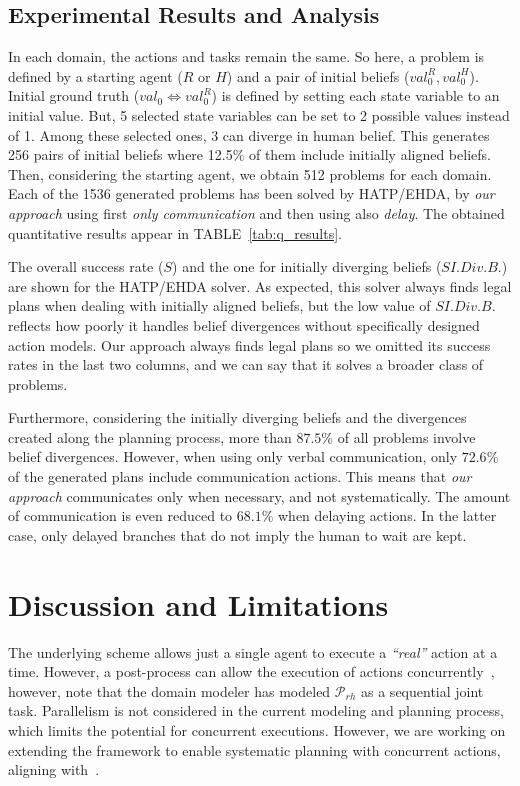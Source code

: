 \subsection{Experimental Results and Analysis}

In each domain, the actions and tasks remain the same. So here, a problem is defined by a starting agent ($R$ or $H$) and a pair of initial beliefs ($val^R_0, val^H_ 0$).
Initial ground truth ($val_0 \Leftrightarrow val^R_0$) is defined by setting each state variable to an initial value. But, 5 selected state variables can be set to 2 possible values instead of 1. Among these selected ones, 3 can diverge in human belief. This generates 256 pairs of initial beliefs where 12.5\% of them include initially aligned beliefs. Then, considering the starting agent, we obtain 512 problems for each domain. 
Each of the 1536 generated problems has been solved by HATP/EHDA, by \textit{our approach} using first \textit{only communication} and then using also \textit{delay}.
The obtained quantitative results appear in TABLE~\ref{tab:q_results}.
 
The overall success rate ($S$) and the one for initially diverging beliefs ($S I.Div.B.$) are shown for the HATP/EHDA solver. As expected, this solver always finds legal plans when dealing with initially aligned beliefs, but the low value of $S I.Div.B.$ reflects how poorly it handles belief divergences without specifically designed action models.
Our approach always finds legal plans so we omitted its success rates in the last two columns, and we can say that it solves a broader class of problems.

Furthermore, considering the initially diverging beliefs and the divergences created along the planning process, more than $87.5\%$ of all problems involve belief divergences. 
However, when using only verbal communication, only $72.6\%$ of the generated plans include communication actions.
This means that \textit{our approach} communicates only when necessary, and not systematically. 
The amount of communication is even reduced to $68.1\%$ when delaying actions. In the latter case, only delayed branches that do not imply the human to wait are kept. 

\section{Discussion and Limitations}

The underlying scheme allows just a single agent to execute a \textit{``real''} action at a time. 
However, a post-process can allow the execution of actions concurrently~\cite{CrosbyJR14}, however, note that the domain modeler has modeled $\mathcal{P}_{rh}$ as a sequential joint task. 
Parallelism is not considered in the current modeling and planning process, which limits the potential for concurrent executions. However, we are working on extending the framework to enable systematic planning with concurrent actions, aligning with~\cite{ShekharB20}.

